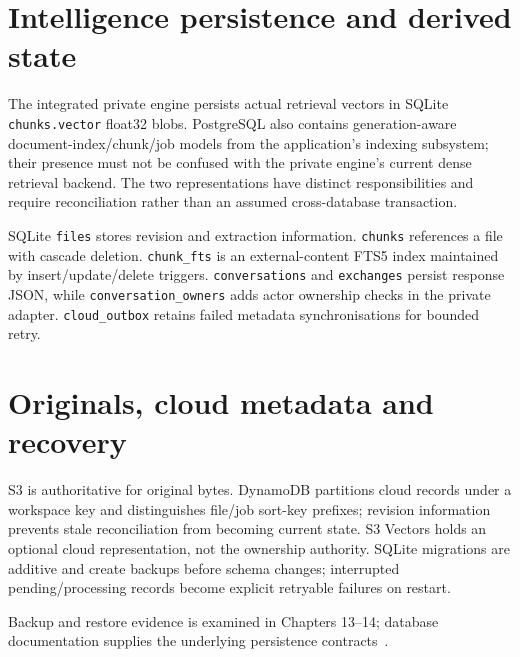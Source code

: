 \section{Intelligence persistence and derived state}
The integrated private engine persists actual retrieval vectors in SQLite \texttt{chunks.vector} float32 blobs. PostgreSQL also contains generation-aware document-index/chunk/job models from the application's indexing subsystem; their presence must not be confused with the private engine's current dense retrieval backend. The two representations have distinct responsibilities and require reconciliation rather than an assumed cross-database transaction.

SQLite \texttt{files} stores revision and extraction information. \texttt{chunks} references a file with cascade deletion. \texttt{chunk\_fts} is an external-content FTS5 index maintained by insert/update/delete triggers. \texttt{conversations} and \texttt{exchanges} persist response JSON, while \texttt{conversation\_owners} adds actor ownership checks in the private adapter. \texttt{cloud\_outbox} retains failed metadata synchronisations for bounded retry.
\section{Originals, cloud metadata and recovery}
S3 is authoritative for original bytes. DynamoDB partitions cloud records under a workspace key and distinguishes file/job sort-key prefixes; revision information prevents stale reconciliation from becoming current state. S3 Vectors holds an optional cloud representation, not the ownership authority. SQLite migrations are additive and create backups before schema changes; interrupted pending/processing records become explicit retryable failures on restart.

Backup and restore evidence is examined in Chapters 13--14; database documentation supplies the underlying persistence contracts~\cite{postgres,sqlitefts}.
\FloatBarrier
